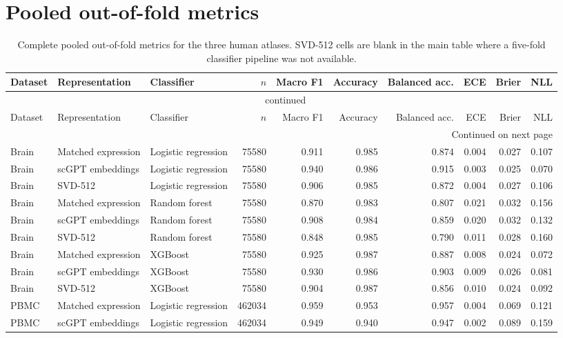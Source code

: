 \clearpage\section{Pooled out-of-fold metrics}

{\footnotesize\setlength{\tabcolsep}{3pt}
\begin{longtable}{lllrrrrrrr}
\caption{Complete pooled out-of-fold metrics for the three human atlases. SVD-512 cells are blank in the main table where a five-fold classifier pipeline was not available.}\label{tab:s-pooled}\\
\toprule
Dataset & Representation & Classifier & $n$ & Macro F1 & Accuracy & Balanced acc. & ECE & Brier & NLL \\
\midrule
\endfirsthead
\multicolumn{10}{c}{\tablename\ \thetable{} continued}\\
\toprule
Dataset & Representation & Classifier & $n$ & Macro F1 & Accuracy & Balanced acc. & ECE & Brier & NLL \\
\midrule
\endhead
\midrule
\multicolumn{10}{r}{Continued on next page}\\
\endfoot
\bottomrule
\endlastfoot
Brain & Matched expression & Logistic regression & 75580 & 0.911 & 0.985 & 0.874 & 0.004 & 0.027 & 0.107 \\
Brain & scGPT embeddings & Logistic regression & 75580 & 0.940 & 0.986 & 0.915 & 0.003 & 0.025 & 0.070 \\
Brain & SVD-512 & Logistic regression & 75580 & 0.906 & 0.985 & 0.872 & 0.004 & 0.027 & 0.106 \\
Brain & Matched expression & Random forest & 75580 & 0.870 & 0.983 & 0.807 & 0.021 & 0.032 & 0.156 \\
Brain & scGPT embeddings & Random forest & 75580 & 0.908 & 0.984 & 0.859 & 0.020 & 0.032 & 0.132 \\
Brain & SVD-512 & Random forest & 75580 & 0.848 & 0.985 & 0.790 & 0.011 & 0.028 & 0.160 \\
Brain & Matched expression & XGBoost & 75580 & 0.925 & 0.987 & 0.887 & 0.008 & 0.024 & 0.072 \\
Brain & scGPT embeddings & XGBoost & 75580 & 0.930 & 0.986 & 0.903 & 0.009 & 0.026 & 0.081 \\
Brain & SVD-512 & XGBoost & 75580 & 0.904 & 0.987 & 0.856 & 0.010 & 0.024 & 0.092 \\
PBMC & Matched expression & Logistic regression & 462034 & 0.959 & 0.953 & 0.957 & 0.004 & 0.069 & 0.121 \\
PBMC & scGPT embeddings & Logistic regression & 462034 & 0.949 & 0.940 & 0.947 & 0.002 & 0.089 & 0.159 \\

\end{longtable}}
